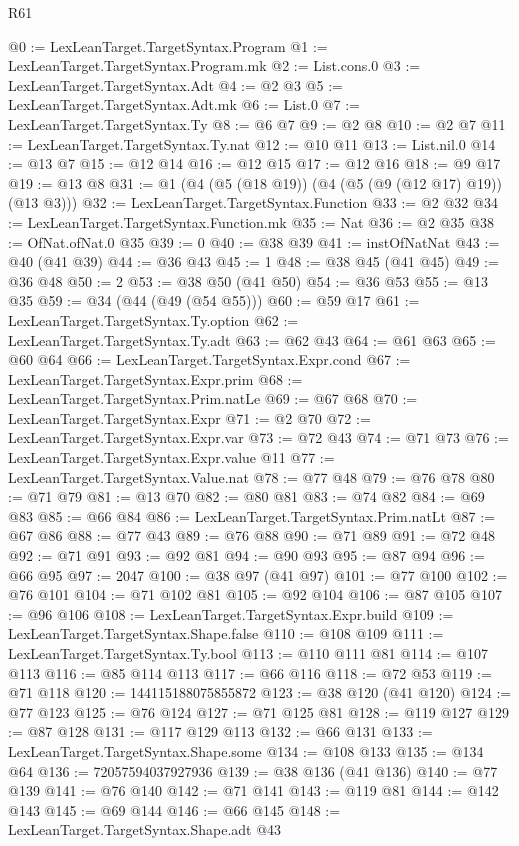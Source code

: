 \begin{lexlean}{R61}
\begin{coremodule}
@0 := LexLeanTarget.TargetSyntax.Program
@1 := LexLeanTarget.TargetSyntax.Program.mk
@2 := List.cons.{0}
@3 := LexLeanTarget.TargetSyntax.Adt
@4 := @2 @3
@5 := LexLeanTarget.TargetSyntax.Adt.mk
@6 := List.{0}
@7 := LexLeanTarget.TargetSyntax.Ty
@8 := @6 @7
@9 := @2 @8
@10 := @2 @7
@11 := LexLeanTarget.TargetSyntax.Ty.nat
@12 := @10 @11
@13 := List.nil.{0}
@14 := @13 @7
@15 := @12 @14
@16 := @12 @15
@17 := @12 @16
@18 := @9 @17
@19 := @13 @8
@31 := @1 (@4 (@5 (@18 @19)) (@4 (@5 (@9 (@12 @17) @19)) (@13 @3)))
@32 := LexLeanTarget.TargetSyntax.Function
@33 := @2 @32
@34 := LexLeanTarget.TargetSyntax.Function.mk
@35 := Nat
@36 := @2 @35
@38 := OfNat.ofNat.{0} @35
@39 := 0
@40 := @38 @39
@41 := instOfNatNat
@43 := @40 (@41 @39)
@44 := @36 @43
@45 := 1
@48 := @38 @45 (@41 @45)
@49 := @36 @48
@50 := 2
@53 := @38 @50 (@41 @50)
@54 := @36 @53
@55 := @13 @35
@59 := @34 (@44 (@49 (@54 @55)))
@60 := @59 @17
@61 := LexLeanTarget.TargetSyntax.Ty.option
@62 := LexLeanTarget.TargetSyntax.Ty.adt
@63 := @62 @43
@64 := @61 @63
@65 := @60 @64
@66 := LexLeanTarget.TargetSyntax.Expr.cond
@67 := LexLeanTarget.TargetSyntax.Expr.prim
@68 := LexLeanTarget.TargetSyntax.Prim.natLe
@69 := @67 @68
@70 := LexLeanTarget.TargetSyntax.Expr
@71 := @2 @70
@72 := LexLeanTarget.TargetSyntax.Expr.var
@73 := @72 @43
@74 := @71 @73
@76 := LexLeanTarget.TargetSyntax.Expr.value @11
@77 := LexLeanTarget.TargetSyntax.Value.nat
@78 := @77 @48
@79 := @76 @78
@80 := @71 @79
@81 := @13 @70
@82 := @80 @81
@83 := @74 @82
@84 := @69 @83
@85 := @66 @84
@86 := LexLeanTarget.TargetSyntax.Prim.natLt
@87 := @67 @86
@88 := @77 @43
@89 := @76 @88
@90 := @71 @89
@91 := @72 @48
@92 := @71 @91
@93 := @92 @81
@94 := @90 @93
@95 := @87 @94
@96 := @66 @95
@97 := 2047
@100 := @38 @97 (@41 @97)
@101 := @77 @100
@102 := @76 @101
@104 := @71 @102 @81
@105 := @92 @104
@106 := @87 @105
@107 := @96 @106
@108 := LexLeanTarget.TargetSyntax.Expr.build
@109 := LexLeanTarget.TargetSyntax.Shape.false
@110 := @108 @109
@111 := LexLeanTarget.TargetSyntax.Ty.bool
@113 := @110 @111 @81
@114 := @107 @113
@116 := @85 @114 @113
@117 := @66 @116
@118 := @72 @53
@119 := @71 @118
@120 := 144115188075855872
@123 := @38 @120 (@41 @120)
@124 := @77 @123
@125 := @76 @124
@127 := @71 @125 @81
@128 := @119 @127
@129 := @87 @128
@131 := @117 @129 @113
@132 := @66 @131
@133 := LexLeanTarget.TargetSyntax.Shape.some
@134 := @108 @133
@135 := @134 @64
@136 := 72057594037927936
@139 := @38 @136 (@41 @136)
@140 := @77 @139
@141 := @76 @140
@142 := @71 @141
@143 := @119 @81
@144 := @142 @143
@145 := @69 @144
@146 := @66 @145
@148 := LexLeanTarget.TargetSyntax.Shape.adt @43

\end{coremodule}
\end{lexlean}
